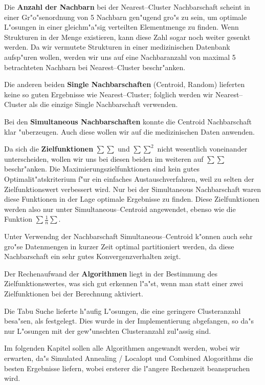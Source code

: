 Die {\bf Anzahl der Nachbarn} bei der Nearest--Cluster Nachbarschaft scheint in
einer Gr"o"senordnung von 5 Nachbarn gen"ugend gro"s zu sein, um optimale
L"osungen in einer gleichm"a"sig verteilten Elementmenge zu finden.
Wenn Strukturen in der Menge existieren, kann diese Zahl sogar noch weiter
gesenkt werden. Da wir vermutete Strukturen in einer medizinischen 
Datenbank aufsp"uren wollen, werden wir uns auf eine Nachbaranzahl von
maximal 5 betrachteten Nachbarn bei Nearest--Cluster beschr"anken.

Die anderen beiden {\bf Single Nachbarschaften} (Centroid, Random) lieferten
keine so guten Ergebnisse wie Nearest--Cluster; folglich werden wir
Nearest--Cluster als die einzige Single Nachbarschaft verwenden.

Bei den {\bf Simultaneous Nachbarschaften} konnte die Centroid Nachbarschaft
klar "uberzeugen. Auch diese wollen wir auf die medizinischen Daten
anwenden.

Da sich die {\bf Zielfunktionen} $\sum\sum$ und $\sum\sum^2$ nicht wesentlich 
voneinander unterscheiden,
wollen wir uns bei diesen beiden im weiteren auf $\sum\sum$ beschr"anken.
Die Maximierungszielfunktionen sind kein gutes Optimalit"atskriterium f"ur 
ein einfaches Austauschverfahren, weil zu selten der Zielfunktionswert
verbessert wird. Nur bei der Simultaneous Nachbarschaft waren diese
Funktionen in der Lage optimale Ergebnisse zu finden. 
Diese Zielfunktionen werden also nur unter Simultaneous--Centroid
angewendet, ebenso wie die Funktion $\sum\frac 1n \sum$.

Unter Verwendng der Nachbarschaft Simultaneous--Centroid k"onnen auch
sehr gro"se Datenmengen in kurzer Zeit optimal partitioniert werden,
da diese Nachbarschaft ein sehr gutes Konvergenzverhalten zeigt.

Der Rechenaufwand der {\bf Algorithmen} liegt in der Bestimmung des
Zielfunktionswertes, was sich gut erkennen l"a"st, wenn man statt einer
zwei Zielfunktionen bei der Berechnung aktiviert.

Die Tabu Suche lieferte h"aufig L"osungen, die eine geringere Clusteranzahl
besa"sen, als festgelegt. Dies wurde in der Implementierung abgefangen,
so da"s nur L"osungen mit der gew"unschten Clusteranzahl zul"assig sind.

Im folgenden Kapitel sollen alle Algorithmen angewandt werden,
wobei wir erwarten, da"s
Simulated Annealing / Localopt und Combined Alogorithms
die besten Ergebnisse liefern, wobei ersterer die l"angere
Rechenzeit beanspruchen wird.

